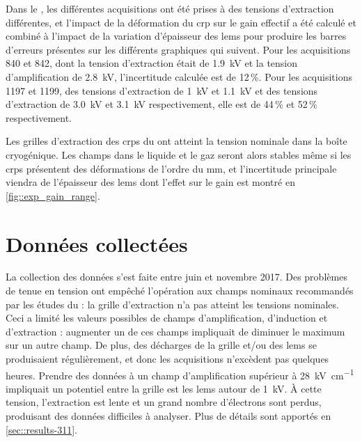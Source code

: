       Dans le \TOO{}, les différentes acquisitions ont été prises à des tensions d'extraction différentes, et l'impact de la déformation du \gls{crp} sur le gain effectif a été calculé et combiné à l'impact de la variation d'épaisseur des \glspl{lem} pour produire les barres d'erreurs présentes sur les différents graphiques qui suivent. Pour les acquisitions 840 et 842, dont la tension d'extraction était de \SI{1.9}{\kilo\volt} et la tension d'amplification de \SI{2.8}{\kilo\volt}, l'incertitude calculée est de 12\,\%. Pour les acquisitions 1197 et 1199, des tensions d'extraction de \SI{1}{\kilo\volt} et \SI{1.1}{\kilo\volt} et des tensions d'extraction de \SI{3.0}{\kilo\volt} et \SI{3.1}{\kilo\volt} respectivement, elle est de 44\,\% et 52\,\% respectivement.

      Les grilles d'extraction des \glspl{crp} du \SSS{} ont atteint la tension nominale dans la boîte cryogénique. Les champs dans le liquide et le gaz seront alors stables même si les \glspl{crp} présentent des déformations de l'ordre du \si{\milli\meter}, et l'incertitude principale viendra de l'épaisseur des \glspl{lem} dont l'effet sur le gain est montré en \autoref{fig::exp_gain_range}.
    
        
  \section{Données collectées}\label{sec::data-311}

    La collection des données s'est faite entre juin et novembre 2017. Des problèmes de tenue en tension ont empêché l'opération aux champs nominaux recommandés par les études du \threeL{} : la grille d'extraction n'a pas atteint les tensions nominales. Ceci a limité les valeurs possibles de champs d'amplification, d'induction et d'extraction : augmenter un de ces champs impliquait de diminuer le maximum sur un autre champ. De plus, des décharges de la grille et/ou des \glspl{lem} se produisaient régulièrement, et donc les acquisitions n'excèdent pas quelques heures. Prendre des données à un champ d'amplification supérieur à \SI{28}{\kilo\volt\per\centi\meter} impliquait un potentiel entre la grille est les \glspl{lem} autour de \SI{1}{\kilo\volt}. À cette tension, l'extraction est lente et un grand nombre d'électrons sont perdus, produisant des données difficiles à analyser. Plus de détails sont apportés en \autoref{sec::results-311}.
 
